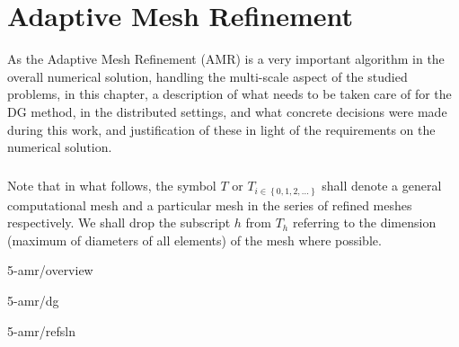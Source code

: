 \chapter{Adaptive Mesh Refinement}
\label{chapter:amr}
As the Adaptive Mesh Refinement (AMR) is a very important algorithm in the overall numerical solution, handling the multi-scale aspect of the studied problems, in this chapter, a description of what needs to be taken care of for the DG method, in the distributed settings, and what concrete decisions were made during this work, and justification of these in light of the requirements on the numerical solution.
\paragraph{}
Note that in what follows, the symbol $T$ or $T_{i\in\left\{0, 1, 2, ...\right\}}$ shall denote a general computational mesh and a particular mesh in the series of refined meshes respectively. We shall drop the subscript $h$ from $T_h$ referring to the dimension (maximum of diameters of all elements) of the mesh where possible.

 {5-amr/overview}

 {5-amr/dg}

 {5-amr/refsln}
